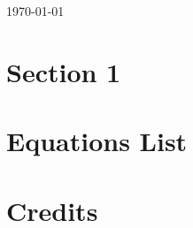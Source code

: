 \documentclass{article}
\title{\name}
\author{Noah Virjee}
\date{June 2022}
\begin{document}
\noindent\parbox{\linewidth}{ %
\parbox{.7\linewidth}{\fontsize{24}{28}\selectfont\thetitle}\hfill%
\parbox{.3\linewidth}{\fontsize{12}{14}\selectfont\raggedleft\today\\\theauthor%
}}

\begin{abstract}
This document is a review of the Grade 12 Physics course. I had some time on my hands and I really needed to study for exams so here goes nothing. If you find any mistakes, please let me know so I can fix them. I hope this helps you!
\end{abstract}

\tableofcontents
\pagebreak

\section{Section 1}

\pagebreak
\appendix
\section{Equations List}


\pagebreak
\section{Credits}
\end{document}
